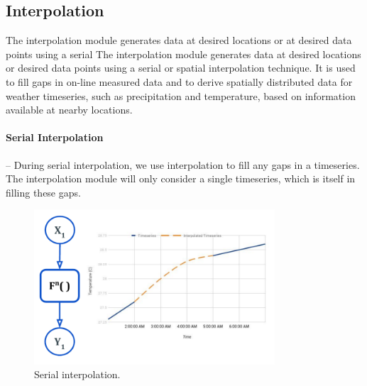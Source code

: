 \subsection{Interpolation}
The interpolation module generates data at desired locations or at desired data points using a serial The interpolation module generates data at desired locations or desired data points using a serial or spatial interpolation technique. It is used to fill gaps in on-line measured data and to derive spatially distributed data for weather timeseries, such as precipitation and temperature, based on information available at nearby locations.

\paragraph{Serial Interpolation}-- During serial interpolation, we use interpolation to fill any gaps in a timeseries. The interpolation module will only consider a single timeseries, which is itself in filling these gaps.

\begin{figure}[htp]
    \centering
    \includegraphics[width=0.8\textwidth]{method/data_preprocess/serial_interpolation.pdf}
    \caption{Serial interpolation.}
    \label{fi:serial_interpolation}
\end{figure}

